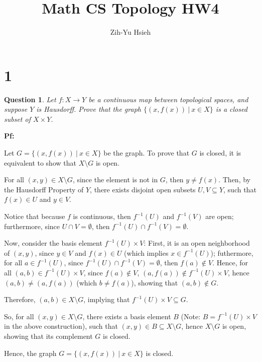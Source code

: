 \documentclass{article}
\title{Math CS Topology HW4}
\author{Zih-Yu Hsieh}
\newtheorem{question}{Question}
\begin{document}
\maketitle

\section*{1}
\begin{myBox}[]{}
    \begin{question}
        Let $f:X\rightarrow Y$ be a continuous map between topological spaces, and suppose
        $Y$ is Hausdorff. Prove that the graph $\{(x,f(x))\ |\ x\in X\}$ is a closed subset of
        $X\times Y$.
    \end{question}
\end{myBox}

\textbf{Pf:}

Let $G=\{(x,f(x))\ |\ x\in X\}$ be the graph. To prove that $G$ is closed, it is equivalent to show that $X\setminus G$ is open.

For all $(x,y)\in X\setminus G$, since the element is not in $G$, then $y\neq f(x)$. Then, by the Hausdorff Property of $Y$, 
there exists disjoint open subsets $U,V\subseteq Y$, such that $f(x)\in U$ and $y\in V$.

\hfill

Notice that because $f$ is continuous, then $f^{-1}(U)$ and $f^{-1}(V)$ are open; furthermore, since $U\cap V=\emptyset$, 
then $f^{-1}(U)\cap f^{-1}(V)=\emptyset$.

Now, consider the basis element $f^{-1}(U)\times V$: First, it is an open neighborhood of $(x,y)$, since $y\in V$ and $f(x)\in U$ (which implies $x\in f^{-1}(U)$);
futhermore, for all $a\in f^{-1}(U)$, since $f^{-1}(U)\cap f^{-1}(V)=\emptyset$, then $f(a)\notin V$. 
Hence, for all $(a,b)\in f^{-1}(U)\times V$, since $f(a)\notin V$, $(a,f(a))\notin f^{-1}(U)\times V$, hence $(a,b)\neq (a,f(a))$ (which $b\neq f(a)$),
showing that $(a,b)\notin G$.

Therefore, $(a,b)\in X\setminus G$, implying that $f^{-1}(U)\times V\subseteq G$.

\hfill

So, for all $(x,y)\in X\setminus G$, there exists a basis element $B$ (Note: $B=f^{-1}(U)\times V$ in the above construction),
such that $(x,y)\in B\subseteq X\setminus G$, hence $X\setminus G$ is open, showing that its complement $G$ is closed.

Hence, the graph $G=\{(x,f(x))\ |\ x\in X\}$ is closed.
\end{document}
